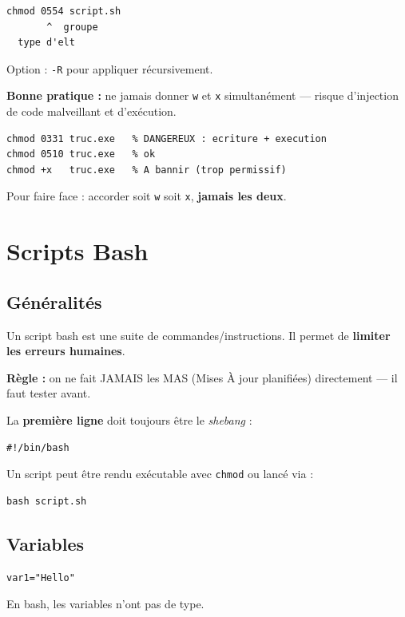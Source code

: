 \documentclass[a4paper,12pt]{article}
\begin{document}
\begin{lstlisting}
chmod 0554 script.sh
       ^  groupe
  type d'elt
\end{lstlisting}

Option : \texttt{-R} pour appliquer récursivement.

\textbf{Bonne pratique :} ne jamais donner \texttt{w} et \texttt{x} simultanément — risque d'injection de code malveillant et d'exécution.

\begin{lstlisting}
chmod 0331 truc.exe   % DANGEREUX : ecriture + execution
chmod 0510 truc.exe   % ok
chmod +x   truc.exe   % A bannir (trop permissif)
\end{lstlisting}

Pour faire face : accorder soit \texttt{w} soit \texttt{x}, \textbf{jamais les deux}.

\section{Scripts Bash}

\subsection{Généralités}

Un script bash est une suite de commandes/instructions. Il permet de \textbf{limiter les erreurs humaines}.

\textbf{Règle :} on ne fait JAMAIS les MAS (Mises À jour planifiées) directement — il faut tester avant.

La \textbf{première ligne} doit toujours être le \textit{shebang} :
\begin{lstlisting}
#!/bin/bash
\end{lstlisting}

Un script peut être rendu exécutable avec \texttt{chmod} ou lancé via :
\begin{lstlisting}
bash script.sh
\end{lstlisting}

\subsection{Variables}

\begin{lstlisting}
var1="Hello"
\end{lstlisting}
En bash, les variables n'ont pas de type.
\end{document}
